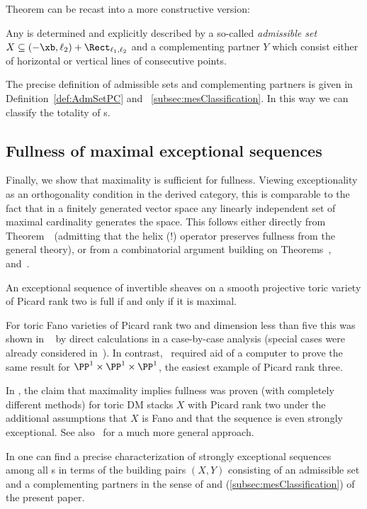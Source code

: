 {Theorem {\thHelex} can be recast into a 
more constructive version:}

\begin{main}  \label{thm:introD}
Any {\mes} is determined {and explicitly described}
by a so-called 
{\em admissible set} $X\subseteq(-\xb,\ell_2)
+\Rect_{\ell_1,\ell_2}$ 
and a complementing partner $Y$ which consist either 
of horizontal or vertical lines of consecutive 
points.
 \end{main}

The precise definition of admissible set{s and complementing partners} 
is given in Definition~\ref{def:AdmSetPC} and
~\ref{subsec:mesClassification}. In this way 
we can classify the totality of {\mes}s.

\subsection{Fullness of maximal exceptional sequences}
\label{subsubsec:FullnessExSeq}
{Finally, we show that maximality is 
sufficient for fullness. Viewing exceptionality 
as an orthogonality condition in the derived 
category, this is comparable to the fact that 
in a finitely generated vector space any linearly 
independent set of maximal cardinality generates 
the space. This follows either directly from Theorem~\thLex\ 
(admitting that the helix (!) operator preserves fullness 
from the general theory), or from a combinatorial argument 
building on Theorems~{\thLex},~{\thHeight} and~{\thClass}.} 

 \begin{main}  \label{thm:introE}
An exceptional sequence of invertible sheaves 
on a smooth projective toric variety of Picard rank 
two is full if and only if it is maximal.
 \end{main}

For toric Fano varieties of Picard rank two and 
dimension less than five this was shown in
~\cite{pic2Fano} by direct calculations in a 
case-by-case analysis {(special cases were 
already considered in~\cite{LiuYangYu})}. 
{In contrast},~\cite{p1p1p1} required aid of a computer to 
prove the same result for $\PP^1\times\PP^1\times\PP^1$, 
the easiest example of Picard rank three.
{
In \cite{BorisovWang}, the claim that maximality implies fullness
was proven (with completely different methods) 
for toric DM stacks $X$ with Picard rank two under the additional
assumptions that $X$ is Fano and that the sequence is even 
strongly exceptional. See also~\cite{DHLKK} for a much more general approach.

In \cite[Theorem 5.3]{exsec} one can find a precise characterization 
of strongly exceptional sequences among all \mes s
in terms of the building pairs $(X,Y)$ consisting of an admissible set and a
complementing partners in the sense of
 and (\ref{subsec:mesClassification}) 
of the present paper.
}

